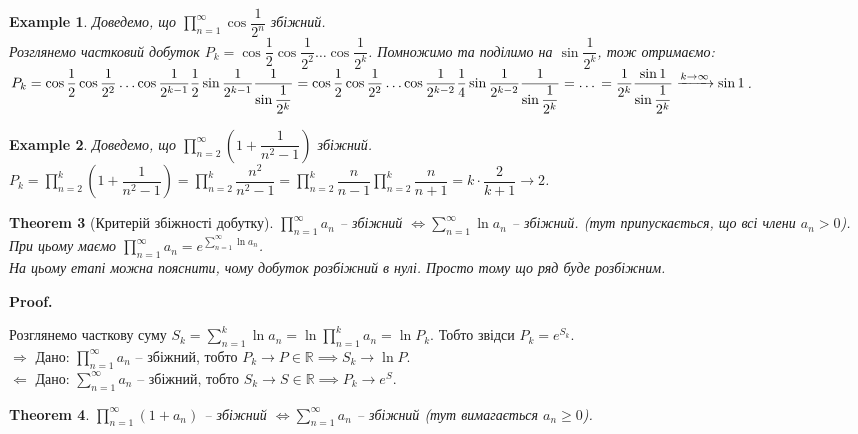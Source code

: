 \documentclass[a4paper, 10pt]{article}
\makeatletter
\def\qed{$\blacksquare$}
\def\rightproof{$\boxed{\Rightarrow}$ }
\def\leftproof{$\boxed{\Leftarrow}$ }
\theoremstyle{theoremdd}
\newtheorem{theorem}{Theorem}[subsection]
\theoremstyle{theoremdd}
\theoremstyle{theoremdd}
\theoremstyle{theoremdd}
\theoremstyle{theoremdd}
\newtheorem{example}[theorem]{Example}
\theoremstyle{theoremdd}
\theoremstyle{theoremdd}
\theoremstyle{theoremdd}
\theoremstyle{theoremdd}
\renewenvironment{proof}[1][Proof.\\]{\par
\pushQED{\hfill \qed}%
\normalfont \topsep6\p@\@plus6\p@\relax
\trivlist
\item\relax
{\bfseries
#1\@addpunct{.}}\hspace\labelsep\ignorespaces
}{%
\popQED\endtrivlist\@endpefalse
}
\makeatother
\begin{document}
\begin{example}
Доведемо, що $\displaystyle\prod_{n=1}^\infty \cos \dfrac{1}{2^n}$ збіжний.\\
Розглянемо частковий добуток $P_k = \cos \dfrac{1}{2} \cos \dfrac{1}{2^2} \dots \cos \dfrac{1}{2^k}$. Помножимо та поділимо на $\sin \dfrac{1}{2^k}$, тож отримаємо:\\
$P_k = \cos \dfrac{1}{2} \cos \dfrac{1}{2^2} \dots \cos \dfrac{1}{2^{k-1}} \dfrac{1}{2} \sin \dfrac{1}{2^{k-1}} \dfrac{1}{\sin \dfrac{1}{2^k}} = \cos \dfrac{1}{2} \cos \dfrac{1}{2^2} \dots \cos \dfrac{1}{2^{k-2}} \dfrac{1}{4} \sin \dfrac{1}{2^{k-2}} \dfrac{1}{\sin \dfrac{1}{2^k}} = \dots \\
= \dfrac{1}{2^k} \dfrac{\sin 1}{\sin \dfrac{1}{2^k}} \xrightarrow{k \to \infty} \sin 1$.
\end{example}

\begin{example}
Доведемо, що $\displaystyle\prod_{n=2}^\infty \left(1 + \dfrac{1}{n^2-1} \right)$ збіжний.\\
$P_k = \displaystyle\prod_{n=2}^k \left( 1 + \dfrac{1}{n^2-1} \right) = \prod_{n=2}^k \dfrac{n^2}{n^2-1} = \prod_{n=2}^k \dfrac{n}{n-1} \prod_{n=2}^k \dfrac{n}{n+1} = k \cdot \dfrac{2}{k+1} \to 2$.
\end{example}

\begin{theorem}[Критерій збіжності добутку]
$\displaystyle\prod_{n=1}^\infty a_n$ -- збіжний $\iff \displaystyle\sum_{n=1}^\infty \ln a_n$ -- збіжний. (тут припускається, що всі члени $a_n > 0$).\\
При цьому маємо $\displaystyle\prod_{n=1}^\infty a_n = e^{\sum_{n=1}^\infty \ln a_n}$.\\
\textit{На цьому етапі можна пояснити, чому добуток розбіжний в нулі. Просто тому що ряд буде розбіжним.}
\end{theorem}

\begin{proof}
Розглянемо часткову суму $S_k = \displaystyle\sum_{n=1}^k \ln a_n = \ln \prod_{n=1}^k a_n = \ln P_k$. Тобто звідси $P_k = e^{S_k}$.\\
\rightproof Дано: $\displaystyle\prod_{n=1}^\infty a_n$ -- збіжний, тобто $P_k \to P \in \mathbb{R} \implies S_k \to \ln P$.\\
\leftproof Дано: $\displaystyle\sum_{n=1}^\infty a_n$ -- збіжний, тобто $S_k \to S \in \mathbb{R} \implies P_k \to e^S$.
\end{proof}

\begin{theorem}
$\displaystyle\prod_{n=1}^\infty (1+a_n)$ -- збіжний $\iff \displaystyle\sum_{n=1}^\infty a_n$ -- збіжний (тут вимагається $a_n \geq 0$).
\end{theorem}
\end{document}
